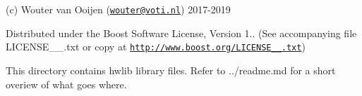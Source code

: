 (c) Wouter van Ooijen (\href{mailto:wouter@voti.nl}{\tt wouter@voti.\+nl}) 2017-\/2019

Distributed under the Boost Software License, Version 1.. (See accompanying file L\+I\+C\+E\+N\+S\+E\+\_\+\_.\+txt or copy at \href{http://www.boost.org/LICENSE_1_0.txt}{\tt http\+://www.\+boost.\+org/\+L\+I\+C\+E\+N\+S\+E\+\_\+\_.\+txt})

This directory contains hwlib library files. Refer to ../readme.md for a short overiew of what goes where. 